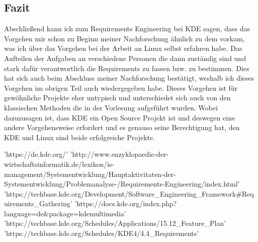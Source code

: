 \documentclass[10pt,a4paper,twocolumn]{article}
\begin{document}
\subsection{Fazit}
Abschließend kann ich zum Requirements Engineering bei KDE sagen, dass das
Vorgehen mir schon zu Beginn meiner Nachforschung ähnlich zu dem vorkam, was ich
über das Vorgehen bei der Arbeit an Linux selbst erfahren habe. Das Aufteilen
der Aufgaben an verschiedene Personen die dann zuständig sind und stark dafür
verantwortlich die Requirements zu fassen bzw. zu bestimmen. Dies hat sich
auch beim Abschluss meiner Nachforschung bestätigt, weshalb ich dieses Vorgehen
im obrigen Teil auch wiedergegeben habe. Dieses Vorgehen ist für gewöhnliche
Projekte eher untypisch und unterschiedet sich auch von den klassischen Methoden
die in der Vorlesung aufgeführt wurden. %
Wobei dazuzusagen ist, dass KDE ein Open Source Projekt ist und deswegen eine
andere Vorgehensweise erfordert und es genauso seine Berechtigung hat, den KDE
und Linux sind beide erfolgreiche Projekte.
\begin{thebibliography}{x}
   'https://de.kde.org/'
   'http://www.enzyklopaedie-der-wirtschaftsinformatik.de/lexikon/is-management/Systementwicklung/Hauptaktivitaten-der-Systementwicklung/Problemanalyse-/Requirements-Engineering/index.html'
   'https://techbase.kde.org/Development/Software\_Engineering\_Framework\#Requirements\_Gathering'
   'https://docs.kde.org/index.php?language=de\&package=kdemultimedia'
   'https://techbase.kde.org/Schedules/Applications/15.12\_Feature\_Plan'
   'https://techbase.kde.org/Schedules/KDE4/4.4\_Requirements'
\end{thebibliography}
\end{document}
